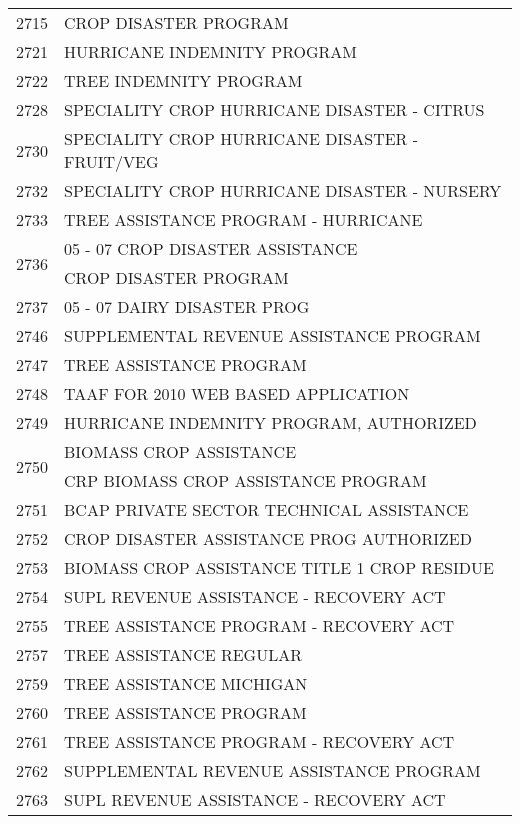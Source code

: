 \begin{longtable}{ll}
\cline{1-2}
2715 & CROP DISASTER PROGRAM \\
\cline{1-2}
2721 & HURRICANE INDEMNITY PROGRAM \\
\cline{1-2}
2722 & TREE INDEMNITY PROGRAM \\
\cline{1-2}
2728 & SPECIALITY CROP HURRICANE DISASTER - CITRUS \\
\cline{1-2}
2730 & SPECIALITY CROP HURRICANE DISASTER - FRUIT/VEG \\
\cline{1-2}
2732 & SPECIALITY CROP HURRICANE DISASTER - NURSERY \\
\cline{1-2}
2733 & TREE ASSISTANCE PROGRAM - HURRICANE \\
\cline{1-2}
\multirow[t]{2}{*}{2736} & 05 - 07 CROP DISASTER ASSISTANCE \\
 & CROP DISASTER PROGRAM \\
\cline{1-2}
2737 & 05 - 07 DAIRY DISASTER PROG \\
\cline{1-2}
2746 & SUPPLEMENTAL REVENUE ASSISTANCE PROGRAM \\
\cline{1-2}
2747 & TREE ASSISTANCE PROGRAM \\
\cline{1-2}
2748 & TAAF FOR 2010 WEB BASED APPLICATION \\
\cline{1-2}
2749 & HURRICANE INDEMNITY PROGRAM, AUTHORIZED \\
\cline{1-2}
\multirow[t]{2}{*}{2750} & BIOMASS CROP ASSISTANCE \\
 & CRP BIOMASS CROP ASSISTANCE PROGRAM \\
\cline{1-2}
2751 & BCAP PRIVATE SECTOR TECHNICAL ASSISTANCE \\
\cline{1-2}
2752 & CROP DISASTER ASSISTANCE PROG AUTHORIZED \\
\cline{1-2}
2753 & BIOMASS CROP ASSISTANCE TITLE 1 CROP RESIDUE \\
\cline{1-2}
2754 & SUPL REVENUE ASSISTANCE - RECOVERY ACT \\
\cline{1-2}
2755 & TREE ASSISTANCE PROGRAM - RECOVERY ACT \\
\cline{1-2}
2757 & TREE ASSISTANCE REGULAR \\
\cline{1-2}
2759 & TREE ASSISTANCE MICHIGAN \\
\cline{1-2}
2760 & TREE ASSISTANCE PROGRAM \\
\cline{1-2}
2761 & TREE ASSISTANCE PROGRAM - RECOVERY ACT \\
\cline{1-2}
2762 & SUPPLEMENTAL REVENUE ASSISTANCE PROGRAM \\
\cline{1-2}
2763 & SUPL REVENUE ASSISTANCE - RECOVERY ACT \\

\end{longtable}
